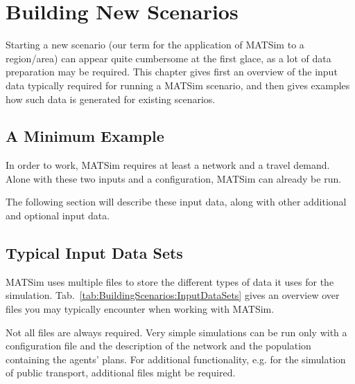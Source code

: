 \chapter{Building New Scenarios}
\label{sec:BuildingScenarios}

 
\bigskip

\begin{chapter-intro}
Starting a new scenario (our term for the application of MATSim to a 
region/area) can appear quite cumbersome at the first glace, as a lot of data
preparation may be required. This chapter gives first an overview of the input
data typically required for running a MATSim scenario, and then gives examples
how such data is generated for existing scenarios.
\end{chapter-intro}


\section{A Minimum Example}

In order to work, MATSim requires at least a network and a travel demand.
Alone with these two inputs and a configuration, MATSim can already be run.

The following section will describe these input data, along with other additional
and optional input data.




\section{Typical Input Data Sets}
MATSim uses multiple files to store the different types of data it uses for the
simulation. Tab.~\ref{tab:BuildingScenarios:InputDataSets} gives an
overview over files you may typically encounter when working with MATSim.

Not all files are always required. Very simple simulations can be run
only with a configuration file and the description of the network and
the population containing the agents' plans. For additional functionality, e.g.
for the simulation of public transport, additional files might be required.

